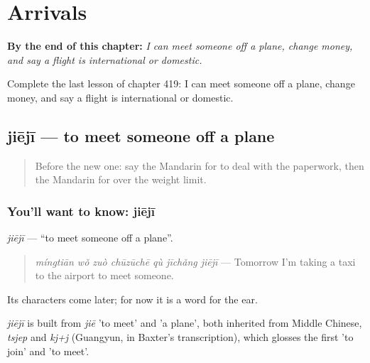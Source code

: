 
\chapter{Arrivals}
\label{ch:zh-arrivals}

\begin{chapteropening}
\textbf{By the end of this chapter:} \emph{I can meet someone off a plane, change money, and say a flight is international or domestic.}

Complete the last lesson of chapter 419: I can meet someone off a plane, change money, and say a flight is international or domestic.
\end{chapteropening}

\section[jiējī]{jiējī — to meet someone off a plane}

\label{lesson:ZH-C419-jieji}



\begin{quote}
Before the new one: say the Mandarin for to deal with the paperwork, then the Mandarin for over the weight limit.
\end{quote}

\subsection*{You'll want to know: jiējī}
\emph{jiējī} — \textquotedblleft{}to meet someone off a plane\textquotedblright{}.

\begin{quote}
\emph{míngtiān wǒ zuò chūzūchē qù jīchǎng jiējī} — Tomorrow I'm taking a taxi to the airport to meet someone.
\end{quote}

Its characters come later; for now it is a word for the ear.

\begin{cousinweb}
\emph{jiējī} is built from \emph{jiē} 'to meet' and  'a plane', both inherited from Middle Chinese, \emph{tsjep} and \emph{kj+j} (Guangyun, in Baxter's transcription), which glosses the first 'to join' and 'to meet'.
\end{cousinweb}

